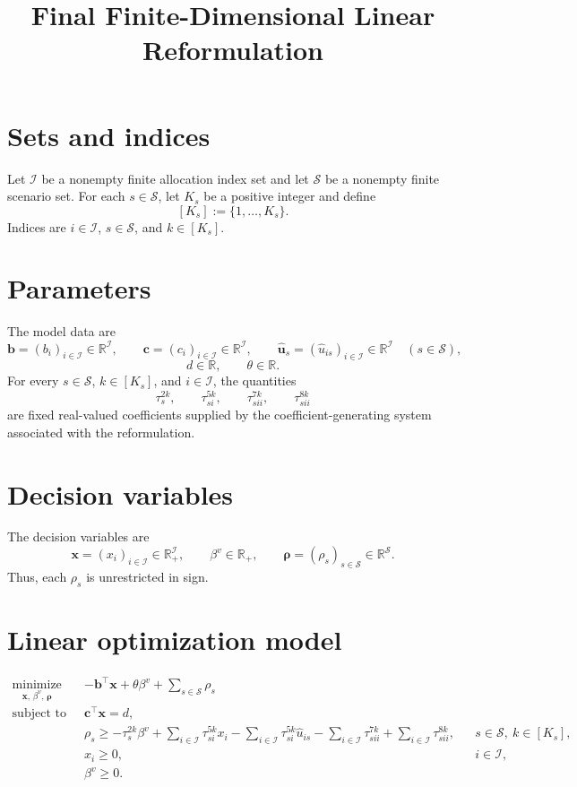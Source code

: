 \documentclass{article}
\title{Final Finite-Dimensional Linear Reformulation}
\author{}
\date{}
\begin{document}
\maketitle

\section*{Sets and indices}
Let \(\mathcal I\) be a nonempty finite allocation index set and let \(\mathcal S\) be a nonempty finite scenario set. For each \(s\in\mathcal S\), let \(K_s\) be a positive integer and define
\[
[K_s]:=\{1,\ldots,K_s\}.
\]
Indices are \(i\in\mathcal I\), \(s\in\mathcal S\), and \(k\in[K_s]\).

\section*{Parameters}
The model data are
\[
\boldsymbol b=(b_i)_{i\in\mathcal I}\in\mathbb R^{\mathcal I},
\qquad
\boldsymbol c=(c_i)_{i\in\mathcal I}\in\mathbb R^{\mathcal I},
\qquad
\hat{\boldsymbol u}_s=(\hat u_{is})_{i\in\mathcal I}\in\mathbb R^{\mathcal I}
\quad(s\in\mathcal S),
\]
\[
d\in\mathbb R,
\qquad
\theta\in\mathbb R.
\]
For every \(s\in\mathcal S\), \(k\in[K_s]\), and \(i\in\mathcal I\), the quantities
\[
\tau_s^{2k},\qquad
\tau_{si}^{5k},\qquad
\tau_{sii}^{7k},\qquad
\tau_{sii}^{8k}
\]
are fixed real-valued coefficients supplied by the coefficient-generating system associated with the reformulation.

\section*{Decision variables}
The decision variables are
\[
\boldsymbol x=(x_i)_{i\in\mathcal I}\in\mathbb R_+^{\mathcal I},
\qquad
\beta^v\in\mathbb R_+,
\qquad
\boldsymbol\rho=(\rho_s)_{s\in\mathcal S}\in\mathbb R^{\mathcal S}.
\]
Thus, each \(\rho_s\) is unrestricted in sign.

\section*{Linear optimization model}
\begin{align}
\underset{\boldsymbol x,\,\beta^v,\,\boldsymbol\rho}{\operatorname{minimize}}
\quad &
-\boldsymbol b^{\top}\boldsymbol x
+\theta\beta^v
+\sum_{s\in\mathcal S}\rho_s
\tag{25a}\\
\text{subject to}\quad
&\boldsymbol c^{\top}\boldsymbol x=d,
\tag{25b}\\
&\rho_s\ge
-\tau_s^{2k}\beta^v
+\sum_{i\in\mathcal I}\tau_{si}^{5k}x_i
-\sum_{i\in\mathcal I}\tau_{si}^{5k}\hat u_{is}
-\sum_{i\in\mathcal I}\tau_{sii}^{7k}
+\sum_{i\in\mathcal I}\tau_{sii}^{8k},
&&s\in\mathcal S,\ k\in[K_s],
\tag{25c}\\
&x_i\ge 0,
&&i\in\mathcal I,
\tag{25d-1}\\
&\beta^v\ge 0.
\tag{25d-2}
\end{align}
\end{document}
